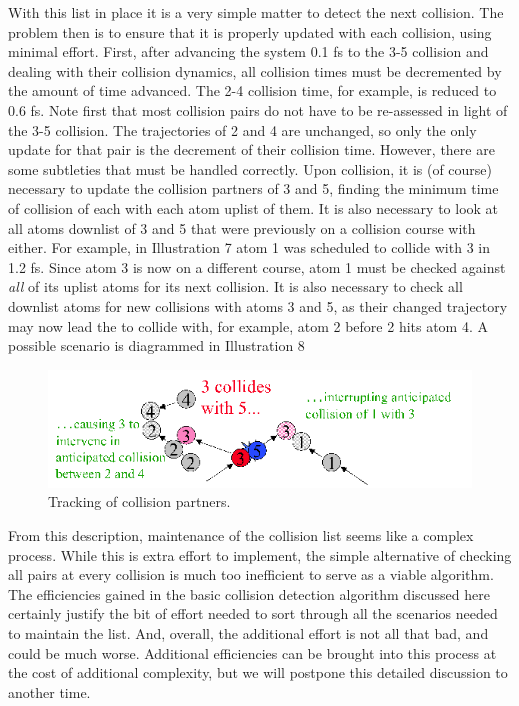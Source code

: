 \documentclass[9pt,bestpractices]{molsim}
\begin{document}
With this list in place it is a very simple matter to detect the next
collision. The problem then is to ensure that it is properly updated
with each collision, using minimal effort. First, after advancing the
system 0.1 fs to the 3-5 collision and dealing with their collision
dynamics, all collision times must be decremented by the amount of time
advanced. The 2-4 collision time, for example, is reduced to 0.6 fs.
Note first that most collision pairs do not have to be re-assessed in
light of the 3-5 collision. The trajectories of 2 and 4 are unchanged,
so only the only update for that pair is the decrement of their
collision time. However, there are some subtleties that must be handled
correctly. Upon collision, it is (of course) necessary to update the
collision partners of 3 and 5, finding the minimum time of collision of
each with each atom uplist of them. It is also necessary to look at all
atoms downlist of 3 and 5 that were previously on a collision course
with either. For example, in Illustration 7 atom 1 was scheduled to
collide with 3 in 1.2 fs. Since atom 3 is now on a different course,
atom 1 must be checked against \emph{all} of its uplist atoms for its
next collision. It is also necessary to check all downlist atoms for new
collisions with atoms 3 and 5, as their changed trajectory may now lead
the to collide with, for example, atom 2 before 2 hits atom 4. A
possible scenario is diagrammed in Illustration 8

\begin{figure}
  \centering
  \includegraphics[width=\textwidth]{HSMD_figures/image042}
  \caption{\label{fig:collisionTracking}Tracking of collision partners.}
\end{figure}

From this description, maintenance of the collision list seems like a
complex process. 
While this is extra effort to implement, the simple alternative of checking all pairs at every
collision is much too inefficient to serve as a viable algorithm.
The
efficiencies gained in the basic collision detection algorithm discussed
here certainly justify the bit of effort needed to sort through all the
scenarios needed to maintain the list.
And, overall, the additional effort is not all that bad, and could be much worse.
Additional efficiencies can be brought into this process at the cost of
additional complexity, but we will postpone this detailed discussion to
another time. 

\end{document}

